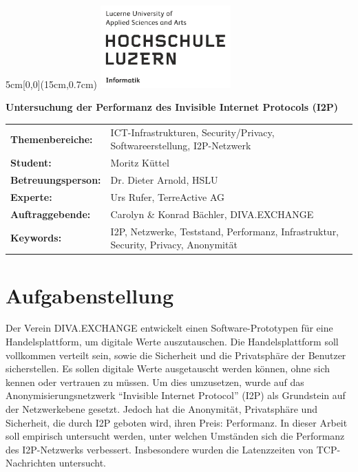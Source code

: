 \documentclass[
	a4paper,10pt
]{scrartcl}
\begin{document}

\begin{textblock*}{5cm}[0,0](15cm,0.7cm)
	\includegraphics[keepaspectratio,width=5cm]{img/HSLU_Logo}
\end{textblock*}

\vspace*{2cm}

\noindent
\textbf{\LARGE{Untersuchung der Performanz des Invisible Internet Protocols (I2P)}} \\

\vspace{0.5em}

\bgroup
\setlength\tabcolsep{0cm}

\begin{large}
\noindent
\begin{tabularx}{\textwidth}{p{5cm}X}
    \textbf{Themenbereiche:} & ICT-Infrastrukturen, Security/Privacy,
                    Softwareerstellung, I2P-Netzwerk \\
	\textbf{Student:} & Moritz Küttel\\
	\textbf{Betreuungsperson:} & Dr. Dieter Arnold, HSLU\\
	\textbf{Experte:} & Urs Rufer, TerreActive AG\\
    \textbf{Auftraggebende:} & Carolyn 
    \& Konrad Bächler, DIVA.EXCHANGE\\
	\textbf{Keywords:} & I2P, Netzwerke, Teststand, Performanz, Infrastruktur, Security, Privacy, Anonymität \\
\end{tabularx}
\end{large}
\egroup

\section{Aufgabenstellung}

Der Verein DIVA.EXCHANGE entwickelt einen Software-Prototypen für eine Handelsplattform, um digitale Werte auszutauschen.
Die Handelsplattform soll vollkommen verteilt sein, sowie die Sicherheit und die Privatsphäre der Benutzer sicherstellen.
Es sollen digitale Werte ausgetauscht werden können, ohne sich kennen oder vertrauen zu müssen.
Um dies umzusetzen, wurde auf das Anonymisierungsnetzwerk ``Invisible Internet Protocol'' (I2P) als Grundstein auf der Netzwerkebene gesetzt.
Jedoch hat die Anonymität, Privatsphäre und Sicherheit, die durch I2P geboten wird, ihren Preis: Performanz.
In dieser Arbeit soll empirisch untersucht werden, unter welchen Umständen sich die Performanz des I2P-Netzwerks verbessert.
Insbesondere wurden die Latenzzeiten von TCP-Nachrichten untersucht.
\end{document}

